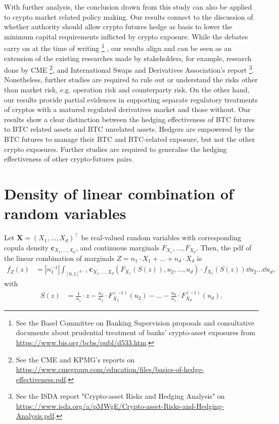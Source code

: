 \documentclass[11pt,a4paper,english]{article}
\begin{document}
With further analysis, the conclusion drawn from this study can also be applied to crypto market related policy making.
Our results connect to the discussion of whether authority should allow crypto futures hedge as basis to lower the minimum capital requirements inflicted by crypto exposure.
While the debates carry on at the time of writing
\footnote{See the Basel Committee on Banking Supervision proposals and consultative documents about prudential treatment of banks' crypto-asset exposures from \url{https://www.bis.org/bcbs/publ/d533.htm}.}
, our results align and can be seen as an extension of the existing researches made by stakeholders,
for example, research done by CME \footnote{See the CME and KPMG's reports on \url{https://www.cmegroup.com/education/files/basics-of-hedge-effectiveness.pdf}.},
and International Swaps and Derivatives Association's report \footnote{See the ISDA report "Crypto-asset Risks and Hedging Analysis" on \url{https://www.isda.org/a/pMWgE/Crypto-asset-Risks-and-Hedging-Analysis.pdf}.}.
Nonetheless, further studies are required to rule out or understand the risks other than market risk, e.g. operation risk and counterparty risk. 
On the other hand, our results provide partial evidences in supporting separate regulatory treatments of cryptos with a matured regulated derivatives market and those without. 
Our results show a clear distinction between the hedging effectiveness of BTC futures to BTC related assets and BTC unrelated assets. 
Hedgers are empowered by the BTC futures to manage their BTC and BTC-related exposure, but not the other crypto exposures.
Further studies are required to generalise the hedging effectiveness of other crypto-futures pairs. 

\clearpage
%
\appendix
\section{Density of linear combination of random variables}
\label{sec:appendix}
\begin{proposition}
   Let $\bm{X} = (X_1, ..., X_d)^\top$ be real-valued random variables with corresponding
   copula density $\bm{c}_{X_1, ..., X_d}$, and continuous marginals $F_{X_1}, ..., F_{X_d}$.
   Then, the
   pdf of the linear combination of marginals $Z = n_1 \cdot X_1 +
   ... +  n_d \cdot X_d $ is
   \begin{align}
   f_Z(z) &= \left| n_1^{-1} \right| \int_{[0,1]^{d-1}} \bm{c}_{X_1,...,X_d}
      \left(F_{X_1} (S(z)), u_2, ..., u_d \right) \cdot
      f_{X_1} (S(z)) \dd u_2 ... \dd u_d, \label{density}
   \end{align}
   with
   \begin{align*}
      S(z) &= \frac{1}{n_1}\cdot z - \frac{n_2}{n_1} \cdot F^{(-1)}_{X_2}(u_2) - ... -  \frac{n_d}{n_1} \cdot F^{(-1)}_{X_d}(u_d).
      \end{align*}
   \end{proposition}
\end{document}
